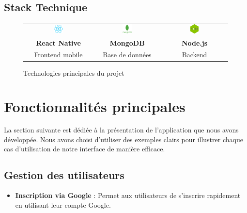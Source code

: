 \documentclass[12pt,a4paper]{report}
\begin{document}
	\subsection{Stack Technique}
	\begin{figure}[H]
		\centering
		\begin{tabular}{ccc}
			\includegraphics[width=0.15\textwidth]{images/react_native.png} &
			\includegraphics[width=0.15\textwidth]{images/mongodb.png} &
			\includegraphics[width=0.15\textwidth]{images/nodejs.png} \\
			\textbf{React Native} & \textbf{MongoDB} & \textbf{Node.js} \\
			Frontend mobile & Base de données & Backend \\
		\end{tabular}
		\caption{Technologies principales du projet}
	\end{figure}
	

	
	
	\section{Fonctionnalités principales}
	La section suivante est dédiée à la présentation de l'application que nous avons développée. Nous avons choisi d'utiliser des exemples clairs pour illustrer chaque cas d'utilisation de notre interface de manière efficace.
	
	\subsection{Gestion des utilisateurs}
	\begin{itemize}
		\item \textbf{Inscription via Google} : Permet aux utilisateurs de s'inscrire rapidement en utilisant leur compte Google.
	\end{itemize}
	
\end{document}

